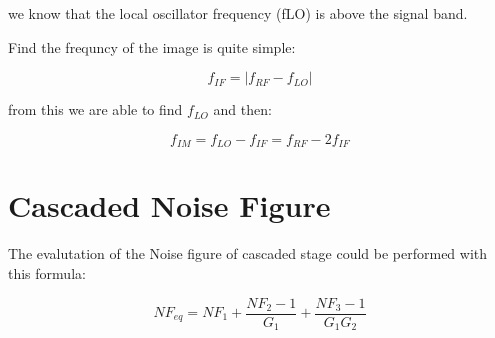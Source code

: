 we know that the local oscillator frequency (fLO) is above the signal band.

Find the frequncy of the image is quite simple:


\begin{equation}
	f_{IF}=|f_{RF}-f_{LO}|
\end{equation}

from this we are able to find $f_{LO}$ and then:

\begin{equation}
		f_{IM}=f_{LO}-f_{IF}= f_{RF}-2f_{IF}
\end{equation}


\section{Cascaded Noise Figure} %
\label{sec:cascaded_noise_figure}

The evalutation of the Noise figure of cascaded stage could be performed with this formula:

\begin{equation}
	NF_{eq}= NF_1 + \frac{NF_2-1}{G_1} + \frac{NF_3-1}{G_1G_2} 
\end{equation}




